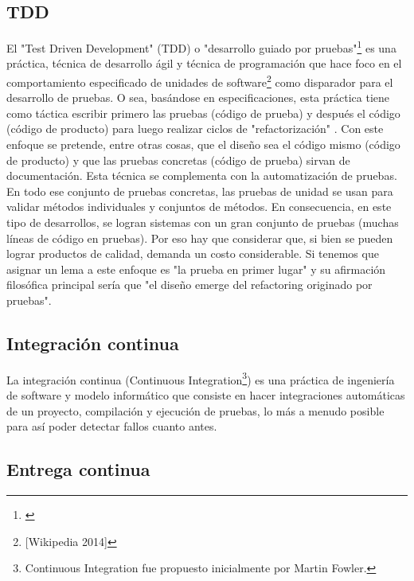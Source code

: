 \subsection{TDD}

El "Test Driven Development" (TDD) o "desarrollo guiado por pruebas"\footnote{\cite{Jurado-2010}} es una práctica, técnica de desarrollo ágil y técnica de programación que hace foco en el comportamiento especificado de unidades de software\footnote{[Wikipedia 2014]} como disparador para el desarrollo de pruebas. O sea, basándose en especificaciones, esta práctica tiene como táctica escribir primero las pruebas (código de prueba) y después el código (código de producto) para luego realizar ciclos de "refactorización" \cite{Kent-Beck-2003}. Con este enfoque se pretende, entre otras cosas, que el diseño sea el código mismo (código de producto) y que las pruebas concretas (código de prueba) sirvan de documentación. Esta técnica se complementa con la automatización de pruebas. En todo ese conjunto de pruebas concretas, las pruebas de unidad se usan para validar métodos individuales y conjuntos de métodos. En consecuencia, en este tipo de desarrollos, se logran sistemas con un gran conjunto de pruebas (muchas líneas de código en pruebas). Por eso hay que considerar que, si bien se pueden lograr productos de calidad, demanda un costo considerable.\newline
Si tenemos que asignar un lema a este enfoque es "la prueba en primer lugar" y su afirmación filosófica principal sería que "el diseño emerge del refactoring originado por pruebas".

\subsection{Integración continua}

La integración continua (Continuous Integration\footnote{Continuous Integration fue propuesto inicialmente por Martin Fowler.}) es una práctica de ingeniería de software y modelo informático que consiste en hacer integraciones automáticas de un proyecto, compilación y ejecución de pruebas, lo más a menudo posible para así poder detectar fallos cuanto antes.

\subsection{Entrega continua}

